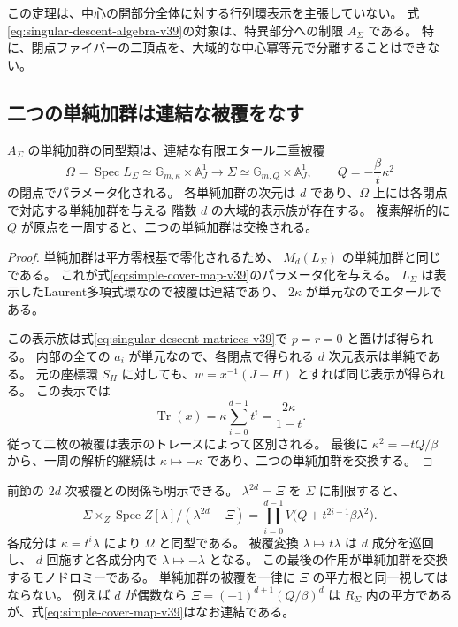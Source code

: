 この定理は、中心の開部分全体に対する行列環表示を主張していない。
式\eqref{eq:singular-descent-algebra-v39}の対象は、特異部分への制限 $A_\Sigma$ である。
特に、閉点ファイバーの二頂点を、大域的な中心冪等元で分離することはできない。

\subsection{二つの単純加群は連結な被覆をなす}

\begin{corollary}[単純加群の二重被覆と大域的表示族]
\label{cor:simple-cover-v39}
$A_\Sigma$ の単純加群の同型類は、連結な有限エタール二重被覆
\begin{equation}
\label{eq:simple-cover-map-v39}
 \Omega=\operatorname{Spec}L_\Sigma
 \simeq\mathbb G_{m,\kappa}\times\mathbb A^1_J
 \longrightarrow
 \Sigma\simeq\mathbb G_{m,Q}\times\mathbb A^1_J,
 \qquad Q=-\frac{\beta}{t}\kappa^2
\end{equation}
の閉点でパラメータ化される。
各単純加群の次元は $d$ であり、$\Omega$ 上には各閉点で対応する単純加群を与える
階数 $d$ の大域的表示族が存在する。
複素解析的に $Q$ が原点を一周すると、二つの単純加群は交換される。
\end{corollary}

\begin{proof}
単純加群は平方零根基で零化されるため、
$M_d(L_\Sigma)$ の単純加群と同じである。
これが式\eqref{eq:simple-cover-map-v39}のパラメータ化を与える。
$L_\Sigma$ は表示したLaurent多項式環なので被覆は連結であり、
$2\kappa$ が単元なのでエタールである。

この表示族は式\eqref{eq:singular-descent-matrices-v39}で $p=r=0$ と置けば得られる。
内部の全ての $a_i$ が単元なので、各閉点で得られる $d$ 次元表示は単純である。
元の座標環 $S_H$ に対しても、$w=x^{-1}(J-H)$ とすれば同じ表示が得られる。
この表示では
\begin{equation}
\label{eq:simple-trace-coordinate-v39}
 \operatorname{Tr}(x)
 =\kappa\sum_{i=0}^{d-1}t^i
 =\frac{2\kappa}{1-t}.
\end{equation}
従って二枚の被覆は表示のトレースによって区別される。
最後に $\kappa^2=-tQ/\beta$ から、一周の解析的継続は
$\kappa\mapsto-\kappa$ であり、二つの単純加群を交換する。
\end{proof}

前節の $2d$ 次被覆との関係も明示できる。
$\lambda^{2d}=\Xi$ を $\Sigma$ に制限すると、
\begin{equation}
\label{eq:sigma-cover-components-v39}
 \Sigma\times_Z\operatorname{Spec}Z[\lambda]/(\lambda^{2d}-\Xi)
 =\coprod_{i=0}^{d-1}
 V\bigl(Q+t^{2i-1}\beta\lambda^2\bigr).
\end{equation}
各成分は $\kappa=t^i\lambda$ により $\Omega$ と同型である。
被覆変換 $\lambda\mapsto t\lambda$ は $d$ 成分を巡回し、
$d$ 回施すと各成分内で $\lambda\mapsto-\lambda$ となる。
この最後の作用が単純加群を交換するモノドロミーである。
単純加群の被覆を一律に $\Xi$ の平方根と同一視してはならない。
例えば $d$ が偶数なら $\Xi=(-1)^{d+1}(Q/\beta)^d$ は
$R_\Sigma$ 内の平方であるが、式\eqref{eq:simple-cover-map-v39}はなお連結である。


